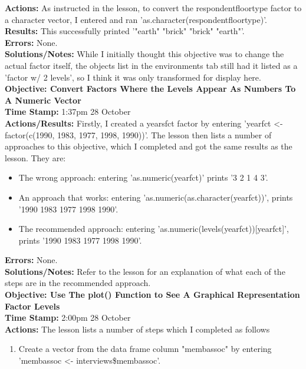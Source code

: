 \documentclass{article}
\begin{document}
\begin{FlushLeft}
\textbf{Actions:} As instructed in the lesson, to convert the respondent\textunderscore floor\textunderscore type factor to a character vector, I entered and ran 'as.character(respondent\textunderscore floor\textunderscore type)'.\\
\textbf{Results:} This successfully printed '"earth" "brick" "brick" "earth"'.\\
\textbf{Errors:} None.\\
\textbf{Solutions/Notes:}  While I initially thought this objective was to change the actual factor itself, the objects list in the environments tab still had it listed as a 'factor w/ 2 levels', so I think it was only transformed for display here.\\
\vspace{5mm}
\textbf{Objective: Convert Factors Where the Levels Appear As Numbers To A Numeric Vector}\\ 
\textbf{Time Stamp:} 1:37pm 28 October\\
\textbf{Actions/Results:} Firstly, I created a years\textunderscore fct factor by entering 'year\textunderscore fct \textless - factor(c(1990, 1983, 1977, 1998, 1990))'. The lesson then lists a number of approaches to this objective, which I completed and got the same results as the lesson. They are:
\begin{itemize}
    \item The wrong approach: entering 'as.numeric(year\textunderscore fct)' prints '3 2 1 4 3'.
    \item An approach that works: entering 'as.numeric(as.character(year\textunderscore fct))', prints '1990 1983 1977 1998 1990'.
    \item The recommended approach: entering 'as.numeric(levels(year\textunderscore fct))[year\textunderscore fct]', prints '1990 1983 1977 1998 1990'.
\end{itemize}
\textbf{Errors:} None.\\
\textbf{Solutions/Notes:} Refer to the lesson for an explanation of what each of the steps are in the recommended approach.\\
\vspace{5mm}
\textbf{Objective: Use The plot() Function to See A Graphical Representation Factor Levels}\\ 
\textbf{Time Stamp:} 2:00pm 28 October\\
\textbf{Actions:} The lesson lists a number of steps which I completed as follows\
\begin{enumerate}
    \item Create a vector from the data frame column "memb\textunderscore assoc" by entering 'memb\textunderscore assoc \textless - interviews\$memb\textunderscore assoc'.

\end{enumerate}
\end{FlushLeft}
\end{document}

